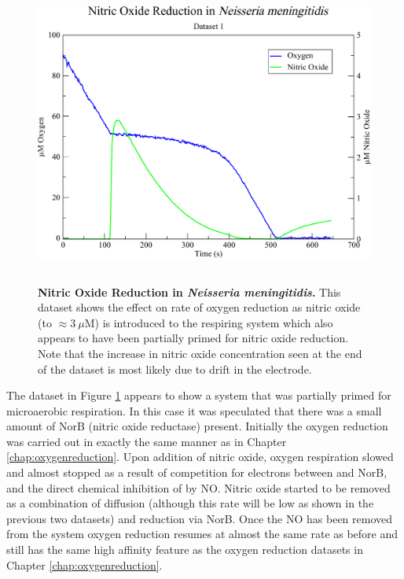 \begin{figure}[tbp]
 \centering
 \includegraphics[height=10cm, clip=true]{./06-noreduction/data/aer-no-data.pdf}
 \caption[{Nitric Oxide Reduction in \textit{Neisseria meningitidis}.}]{{\bf Nitric Oxide Reduction in \textit{Neisseria meningitidis}.} This dataset shows the effect on rate of oxygen reduction as nitric oxide (to $\approx 3~\mu \mathrm{M}$) is introduced to the respiring system which also appears to have been partially primed for nitric oxide reduction. Note that the increase in nitric oxide concentration seen at the end of the dataset is most likely due to drift in the electrode.}
 \label{fig:nodata}
\end{figure}
The dataset in Figure \ref{fig:nodata} appears to show a system that was partially primed for microaerobic respiration. In this case it was speculated that there was a small amount of NorB (nitric oxide reductase) present. Initially the oxygen reduction was carried out in exactly the same manner as in Chapter \ref{chap:oxygenreduction}. Upon addition of nitric oxide, oxygen respiration slowed and almost stopped as a result of competition for electrons between \cbbthree{} and NorB, and the direct chemical inhibition of \cbbthree{} by NO. Nitric oxide started to be removed as a combination of diffusion (although this rate will be low as shown in the previous two datasets) and reduction via NorB. Once the NO has been removed from the system oxygen reduction resumes at almost the same rate as before and still has the same high affinity feature as the oxygen reduction datasets in Chapter \ref{chap:oxygenreduction}.

